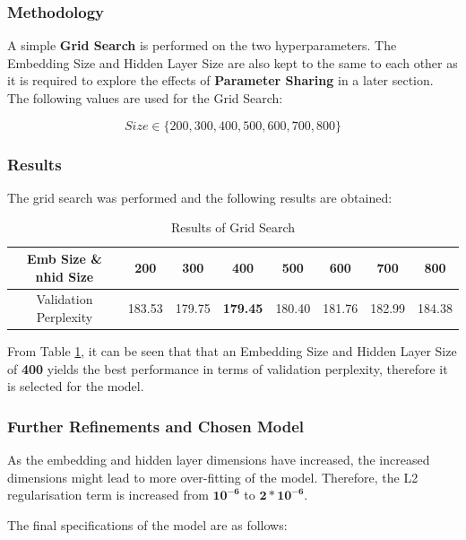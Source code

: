 \documentclass[sigconf,nonacm=true]{acmart}
\begin{document}
\subsubsection{Methodology}
A simple \textbf{Grid Search} is performed on the two hyperparameters. The Embedding Size and Hidden Layer Size are also kept to the same to each other as it is required to explore the effects of \textbf{Parameter Sharing} in a later section. The following values are used for the Grid Search:

\begin{displaymath}
Size \in \{200, 300, 400, 500, 600, 700, 800\}
\end{displaymath}
\subsubsection{Results} 
The grid search was performed and the following results are obtained:
\begin{table}[h]

	\begin{adjustbox}{width=\columnwidth}
		\begin{tabular}{cccccccc}
			\toprule
			Emb Size \& nhid Size & 200 & 300 & \textbf{400} & 500 & 600 & 700 & 800 \\
			\midrule
			Validation Perplexity& 183.53 & 179.75 & \textbf{179.45} & 180.40 & 181.76 & 182.99 & 184.38 \\
			\bottomrule
		\end{tabular}
	\end{adjustbox}
	\caption{Results of Grid Search}
	\label{tab:gridsearch}
\end{table}

From Table \ref{tab:gridsearch}, it can be seen that that an Embedding Size and Hidden Layer Size of \textbf{400} yields the best performance in terms of validation perplexity, therefore it is selected for the model.


\subsubsection{Further Refinements and Chosen Model}
\label{subsubsection:chosenmodel}
As the embedding and hidden layer dimensions have increased, the increased dimensions might lead to more over-fitting of the model. Therefore, the L2 regularisation term is increased from \(\mathbf{10^{-6}}\) to \(\mathbf{2 * 10^{-6}}\). 

The final specifications of the model are as follows:
\end{document}
